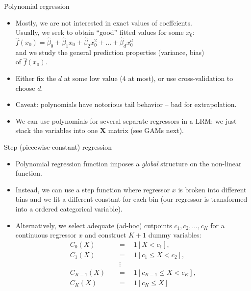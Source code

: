 \documentclass{beamer}
\begin{document}
\begin{frame}{Polynomial regression}
\begin{itemize}
    \item Mostly, we are not interested in exact values of coeffcients.\\
    Usually, we seek to obtain ``good'' fitted values for some $x_0$: \\ \smallskip 
    $\hat{f}(x_0) = \hat{\beta}_0 + \hat{\beta}_1 x_0 + \hat{\beta}_2 x_0^2 + \dots + \hat{\beta}_d x_0^d $\\ \smallskip 
    and we study the general  prediction properties (variance, bias) \\of  $\hat{f}(x_0)$.
    \smallskip
    \item Either fix the $d$ at some low value (4 at most), or use cross-validation to choose $d$.
    \smallskip
    \item Caveat: polynomials have notorious tail behavior -- bad for extrapolation.
    \smallskip 
    \item We can use polynomials for several separate regressors in a LRM: we just stack the variables into one $\bm{X}$ matrix (see GAMs next).
    
\end{itemize}
\end{frame}
\begin{frame}{Step (piecewise-constant) regression}
\begin{itemize}
    \item Polynomial regression function imposes a \textit{global} structure on the non-linear function.
    \smallskip
    \item Instead, we can use a step function where regressor $x$ is broken into different bins and we fit a different constant for each bin (our regressor is transformed into a ordered categorical variable).
    \smallskip
    \item Alternatively, we select adequate (ad-hoc) cutpoints $c_1, c_2, \dots, c_K$ for a continuous regressor $x$ and construct $K+1$ dummy variables:
    \begin{equation*}
       \begin{aligned}
       C_0(X) \quad &= \quad 1[X < c_1], \\
       C_1(X) \quad &= \quad 1[c_1 \leq X < c_2], \\
        &~ \vdots \\
       C_{K-1}(X) \quad &= \quad 1[c_{K-1} \leq X < c_{K}], \\
       C_K(X) \quad &= \quad 1[c_{K} \leq X] \\
        \end{aligned}    
        \end{equation*}
\end{itemize}
\end{frame}
\end{document}
